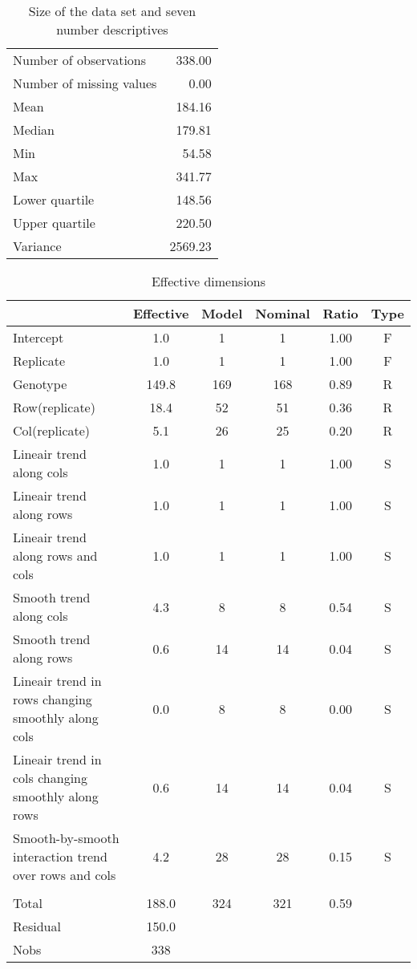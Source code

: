 \documentclass[a4paper,11pt]{article}\usepackage[]{graphicx}\usepackage[]{color}
\begin{document}
\begin{table}[ht]
\begin{flushleft}
\caption{Size of the data set and seven number descriptives} 
\label{modelSummary}
\begin{tabular}{lr}
  \hline
  \hline
Number of observations & 338.00 \\ 
  Number of missing values & 0.00 \\ 
  Mean & 184.16 \\ 
  Median & 179.81 \\ 
  Min & 54.58 \\ 
  Max & 341.77 \\ 
  Lower quartile & 148.56 \\ 
  Upper quartile & 220.50 \\ 
  Variance & 2569.23 \\ 
   \hline
\end{tabular}
\end{flushleft}
\end{table}
\begin{table}[ht]
\begin{flushleft}
\caption{Effective dimensions} 
\label{effDims}
\begin{tabular}{lccccc}
  \hline
 & Effective & Model & Nominal & Ratio & Type \\ 
  \hline
Intercept & 1.0 & 1 & 1 & 1.00 & F \\ 
  Replicate & 1.0 & 1 & 1 & 1.00 & F \\ 
  Genotype & 149.8 & 169 & 168 & 0.89 & R \\ 
  Row(replicate) & 18.4 & 52 & 51 & 0.36 & R \\ 
  Col(replicate) & 5.1 & 26 & 25 & 0.20 & R \\ 
  Lineair trend along cols & 1.0 & 1 & 1 & 1.00 & S \\ 
  Lineair trend along rows & 1.0 & 1 & 1 & 1.00 & S \\ 
  Lineair trend along rows and cols & 1.0 & 1 & 1 & 1.00 & S \\ 
  Smooth trend along cols & 4.3 & 8 & 8 & 0.54 & S \\ 
  Smooth trend along rows & 0.6 & 14 & 14 & 0.04 & S \\ 
  Lineair trend in rows changing smoothly along cols & 0.0 & 8 & 8 & 0.00 & S \\ 
  Lineair trend in cols changing smoothly along rows & 0.6 & 14 & 14 & 0.04 & S \\ 
  Smooth-by-smooth interaction trend over rows and cols & 4.2 & 28 & 28 & 0.15 & S \\ 
   &  &  &  &  &  \\ 
  Total & 188.0 & 324 & 321 & 0.59 &  \\ 
  Residual & 150.0 &  &  &  &  \\ 
  Nobs & 338 &  &  &  &  \\ 
   \hline
\end{tabular}
\end{flushleft}
\end{table}
\end{document}
